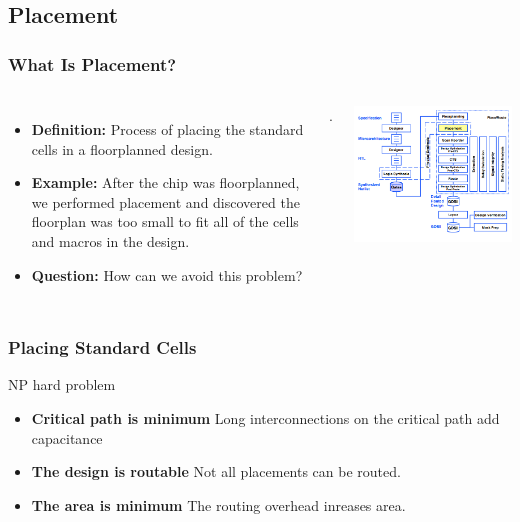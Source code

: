 \documentclass[compress]{beamer}
\begin{document}
\subsection[Place]{Placement}
\begin{frame}
	\frametitle{What Is Placement?}
	\begin{columns}
		\begin{itemize}
			\item \textbf {Definition:} Process of placing the standard cells in a floorplanned design.
			\item \textbf {Example:} After the chip was floorplanned, we performed placement and discovered the floorplan was too small to fit all of the cells and macros in the design.
			\item \textbf {Question:} How can we avoid this problem?
		\end{itemize}.
		\begin{center}
			\includegraphics[width=\textwidth]{place}
		\end{center}
	\end{columns}
\end{frame}
\begin{frame}
	\frametitle{Placing Standard Cells}
	\begin{block}{NP hard problem}
		\begin{itemize}
			\item \textbf{Critical path is minimum}\newline
			Long interconnections on the critical path add capacitance
			\item \textbf{The design is routable}\newline
			Not all placements can be routed.
			\item \textbf{The area is minimum}\newline
			The routing overhead inreases area.
		\end{itemize}
	\end{block}
\end{frame}
\end{document}
